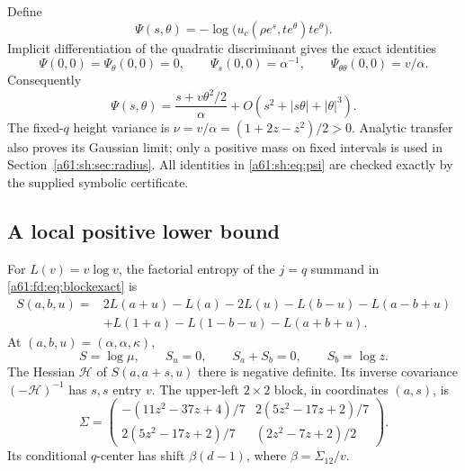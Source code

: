 \documentclass[11pt,letterpaper]{article}
\numberwithin{equation}{section}
\theoremstyle{remark}\newtheorem{remark}[theorem]{Remark}
\begin{document}
Define
\[
 \Psi(s,\theta)=-\log\bigl(u_c(\rho e^s,te^\theta)te^\theta\bigr).
\]
Implicit differentiation of the quadratic discriminant gives the exact identities
\begin{equation}\label{a61:sh:eq:psi}
 \Psi(0,0)=\Psi_\theta(0,0)=0,\qquad
 \Psi_s(0,0)=\alpha^{-1},\qquad
 \Psi_{\theta\theta}(0,0)=v/\alpha.
\end{equation}
Consequently
\begin{equation}\label{a61:sh:eq:psiexp}
 \Psi(s,\theta)=\frac{s+v\theta^2/2}{\alpha}
 +O(s^2+|s\theta|+|\theta|^3).
\end{equation}
The fixed-$q$ height variance is $\nu=v/\alpha=(1+2z-z^2)/2>0$. Analytic transfer also proves its Gaussian limit; only a positive mass on fixed intervals is used in Section~\ref{a61:sh:sec:radius}. All identities in \eqref{a61:sh:eq:psi} are checked exactly by the supplied symbolic certificate.

\subsection{A local positive lower bound}
For $L(v)=v\log v$, the factorial entropy of the $j=q$ summand in \eqref{a61:fd:eq:blockexact} is
\begin{align*}
 S(a,b,u)={}&2L(a+u)-L(a)-2L(u)-L(b-u)-L(a-b+u)\\
 &+L(1+a)-L(1-b-u)-L(a+b+u).
\end{align*}
At $(a,b,u)=(\alpha,\alpha,\kappa)$,
\[
 S=\log\mu,\qquad S_u=0,\qquad S_a+S_b=0,\qquad S_b=\log z.
\]
The Hessian $\mathcal H$ of $S(a,a+s,u)$ there is negative definite. Its inverse covariance $(-\mathcal H)^{-1}$ has $s,s$ entry $v$. The upper-left $2\times2$ block, in coordinates $(a,s)$, is
\begin{equation}\label{a61:sh:eq:Sigma}
 \Sigma=\begin{pmatrix}
 -(11z^2-37z+4)/7&2(5z^2-17z+2)/7\\
 2(5z^2-17z+2)/7&(2z^2-7z+2)/2
 \end{pmatrix}.
\end{equation}
Its conditional $q$-center has shift $\beta(d-1)$, where $\beta=\Sigma_{12}/v$.
\end{document}
